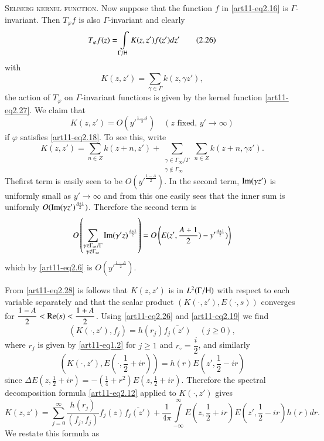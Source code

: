 \medskip
\noindent
\textsc{Selberg kernel function.} Now suppose that the function $f$ in \eqref{art11-eq2.16} is $\Gamma$-invariant. Then $T_\varphi f$  is also $\Gamma$-invariant and clearly
\begin{equation*}
T_\varphi f(z) = \int\limits_{\Gamma / \mathsf{H}} K(z, z') f(z') dz' \tag{2.26}\label{art11-eq2.26}
\end{equation*}
with 
\begin{equation*}
K(z, z') = \sum\limits_{\gamma \in \Gamma} k (z, \gamma z'),  \tag{2.27}\label{art11-eq2.27}
\end{equation*}
\ie the action of $T_\varphi$ on $\Gamma$-invariant functions is given by the kernel function \eqref{art11-eq2.27}. We claim that 
\begin{equation*}
K(z,z') = O(y'^{\frac{1-A}{2}}) \quad  (z \text{ fixed, }y' \longrightarrow \infty) \label{art11-eq2.28}
\end{equation*}
if $\varphi$ satisfies \eqref{art11-eq2.18}. To see this, write 
$$
K(z,z') =  \sum\limits_{n\in Z} k (z + n, z') + \sum\limits_{\substack{\gamma \in \Gamma_\infty / \Gamma \\ \gamma \not\in \Gamma_\infty}} \sum\limits_{n\in Z} k(z+n, \gamma z').
$$
The\pageoriginale first term is easily seen to be $O(y'^{\frac{1-A}{2}})$. In the second term, $\operatorname{Im} (\gamma z')$ is uniformly small as $y' \to \infty$ and from this one easily sees that the inner sum is uniformly $O(\operatorname{Im} (\gamma z')^{\frac{A+1}{2}})$. Therefore the second term is 
$$
O\left(\sum\limits_{\substack{\gamma \in \Gamma_\infty/ \Gamma\\ \gamma \not\in \Gamma_\infty}}  \operatorname{Im} (\gamma' z)^{\frac{A+1}{2}} \right) = O \left(E(z' , \frac{A+1}{2})  - y'^{\frac{A+1}{2}}) \right)
$$
which by \eqref{art11-eq2.6} is $O(y'^{\frac{1-A}{2}})$.

From \eqref{art11-eq2.28} is follows that $K(z, z')$ is in $L^2 (\Gamma / \mathsf{H})$ with respect to each variable separately and that the scalar product $(K(\cdot, z'), E (\cdot, s))$ converges for $\dfrac{1-A}{2} < \operatorname{Re} (s) < \dfrac{1+A}{2}$. Using \eqref{art11-eq2.26} and \eqref{art11-eq2.19} we find 
\begin{equation*}
(K(\cdot, z'), f_j) = h  (r_j ) \bar{f_j(z')} \quad (j \geq 0), \tag{2.29}\label{art11-eq2.29}
\end{equation*}
where $r_j$ is given by \eqref{art11-eq1.2} for $j \geq 1$ and $r_\circ = \dfrac{i}{2}$, and similarly
$$
(K(\cdot, z'), E (\cdot, \frac{1}{2} + ir)) = h (r) E (z', \frac{1}{2} - ir)
$$
since $\Delta E(z, \frac{1}{2} + ir) = - \left(\frac{1}{4} + r^2 \right) E (z, \frac{1}{2} + ir)$. Therefore the spectral decomposition formula \eqref{art11-eq2.12} applied to $K(\cdot, z')$ gives 
$$
K(z, z') = \sum\limits^\infty_{j=0} \frac{h(r_j)}{(f_j , f_j)} f_j (z) \overline{f_j(z')} + \frac{1}{4 \pi} 
\int\limits^\infty_{-\infty} E (z,\frac{1}{2} + ir) E (z' , \frac{1}{2} - ir) h (r) dr. 
$$
We restate this formula as 

